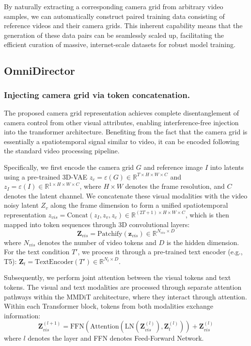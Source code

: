 \documentclass{llmxive}
\begin{document}
By naturally extracting a corresponding camera grid from arbitrary video samples, we can automatically construct paired training data consisting of reference videos and their camera grids. This inherent capability means that the generation of these data pairs can be seamlessly scaled up, facilitating the efficient curation of massive, internet-scale datasets for robust model training.


\subsection{OmniDirector}

\subsubsection{Injecting camera grid via token concatenation.}
The proposed camera grid representation achieves complete disentanglement of camera control from other visual attributes, enabling interference-free injection into the transformer architecture. Benefiting from the fact that the camera grid is essentially a spatiotemporal signal similar to video, it can be encoded following the standard video processing pipeline. 

Specifically, we first encode the camera grid $G$ and reference image $I$ into latents using a pre-trained 3D-VAE $z_c = \varepsilon(G) \in \mathbb{R}^{T \times H \times W \times C}$ and $z_I = \varepsilon(I) \in \mathbb{R}^{1 \times H \times W \times C} $, where $H \times W$ denotes the frame resolution, and $C$ denotes the latent channel. We concatenate these visual modalities with the video noisy latent $Z_v$ along the frame dimension to form a unified spatiotemporal representation $z_{vis}=\text{Concat}(z_I, z_v, z_c) \in \mathbb{R}^{(2T+1) \times H \times W \times C}$, which is then mapped into token sequences through 3D convolutional layers:
\begin{equation}
\mathbf{Z}_{vis} = \text{Patchify}(\mathbf{z}_{vis}) \in \mathbb{R}^{N_{vis} \times D}
\end{equation}
where $N_{vis}$ 
denotes the number of video tokens and $D$ is the hidden dimension. 
For the text condition $T'$, we process it through a pre-trained text encoder (e.g., T5): $\mathbf{Z}_t = \text{TextEncoder}(T') \in \mathbb{R}^{N_t \times D}$. 

Subsequently, we perform joint attention between the visual tokens and text tokens. The visual and text modalities are processed through separate attention pathways within the MMDiT architecture, where they interact through attention. Within each Transformer block, tokens from both modalities exchange information:
\begin{equation}
\mathbf{Z}_{vis}^{(l+1)} = \text{FFN}(\text{Attention}(\text{LN}(\mathbf{Z}_{vis}^{(l)}), \mathbf{Z}_t^{(l)})) + \mathbf{Z}_{vis}^{(l)}
\end{equation}
where $l$ denotes the layer and FFN denotes Feed-Forward Network. 
\end{document}
